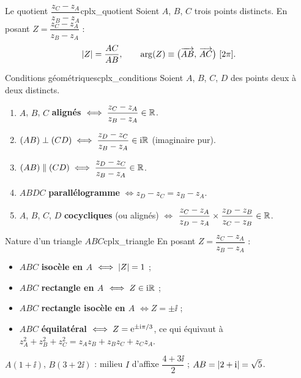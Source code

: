\begin{propriete}{Le quotient $\dfrac{z_C - z_A}{z_B - z_A}$}{cplx_quotient}
	Soient $A$, $B$, $C$ trois points distincts. En posant
	$Z = \dfrac{z_C - z_A}{z_B - z_A}$ :
	$$
	\abs{Z} = \frac{AC}{AB},
	\qquad
	\arg(Z) \equiv \bigl(\vect{AB},\,\vect{AC}\bigr)\ [2\pi].
	$$
\end{propriete}

\begin{propriete}{Conditions géométriques}{cplx_conditions}
	Soient $A$, $B$, $C$, $D$ des points deux à deux distincts.
	\begin{enumerate}
		\item $A$, $B$, $C$ \textbf{alignés} $\iff \dfrac{z_C - z_A}{z_B - z_A} \in \mathbb{R}$.
		\item $(AB) \perp (CD) \iff \dfrac{z_D - z_C}{z_B - z_A} \in \mathrm{i}\mathbb{R}$
		(imaginaire pur).
		\item $(AB) \parallel (CD) \iff \dfrac{z_D - z_C}{z_B - z_A} \in \mathbb{R}$.
		\item $ABDC$ \textbf{parallélogramme} $\iff z_D - z_C = z_B - z_A$.
		\item $A$, $B$, $C$, $D$ \textbf{cocycliques} (ou alignés) $\iff$
		$\dfrac{z_C - z_A}{z_D - z_A} \times \dfrac{z_D - z_B}{z_C - z_B} \in \mathbb{R}$.
	\end{enumerate}
\end{propriete}

\begin{propriete}{Nature d'un triangle $ABC$}{cplx_triangle}
	En posant $Z = \dfrac{z_C - z_A}{z_B - z_A}$ :
	\begin{itemize}[label=\textbullet]
		\item $ABC$ \textbf{isocèle en $A$} $\iff \left|Z\right| = 1$ ;
		\item $ABC$ \textbf{rectangle en $A$} $\iff Z \in \mathrm{i}\mathbb{R}$ ;
		\item $ABC$ \textbf{rectangle isocèle en $A$} $\iff Z = \pm\ii$ ;
		\item $ABC$ \textbf{équilatéral} $\iff Z = \mathrm{e}^{\pm\mathrm{i}\pi/3}$, ce qui
		équivaut à $z_A^2 + z_B^2 + z_C^2 = z_A z_B + z_B z_C + z_C z_A$.
	\end{itemize}
\end{propriete}

\begin{exemple}
	$A(1+\ii)$, $B(3+2\ii)$ : milieu $I$ d'affixe $\dfrac{4 + 3\ii}{2}$ ;
	$AB = \left|2 + \mathrm{i}\right| = \sqrt{5}$.
\end{exemple}


